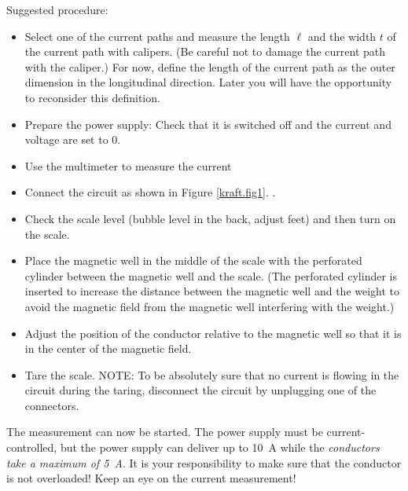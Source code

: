 \documentclass[../Elmag-labhefte-2020.tex]{subfiles}
\begin{document}
Suggested procedure:
%
\begin{itemize}
    \item Select one of the current paths and measure the length $\ell$ and the width $t$ of the current path with calipers. (Be careful not to damage the current path with the caliper.) For now, define the length of the current path as the outer dimension in the longitudinal direction. %
    Later you will have the opportunity to reconsider this definition.
     
    \item Prepare the power supply: Check that it is switched off and the current and voltage are set to 0.
    \item Use the multimeter to measure the current
    \item Connect the circuit as shown in Figure \ref{kraft.fig1}. .
    \item Check the scale level (bubble level in the back, adjust feet) and then turn on the scale.
    \item Place the magnetic well in the middle of the scale with the perforated cylinder between the magnetic well and the scale. %
    (The perforated cylinder is inserted to increase the distance between the magnetic well and the weight to avoid the magnetic field from the magnetic well interfering with the weight.)
    \item Adjust the position of the conductor relative to the magnetic well so that it is in the center of the magnetic field.
    \item Tare the scale.
    NOTE: To be absolutely sure that no current is flowing in the circuit during the taring, disconnect the circuit by unplugging one of the connectors.
    \end{itemize}
    
The measurement can now be started. The power supply must be current-controlled, but the power supply can deliver up to \SI{10}{\ampere} while the \emph{conductors take a maximum of \SI{5}{\ampere}}. It is your responsibility to make sure that the conductor is not overloaded! Keep an eye on the current measurement!
\end{document}
